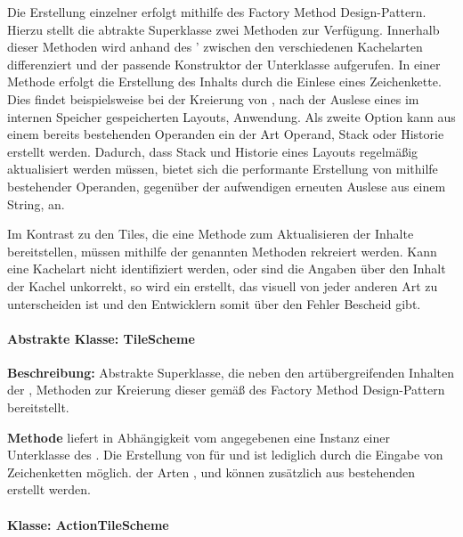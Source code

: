 Die Erstellung einzelner  erfolgt mithilfe des Factory Method Design-Pattern. Hierzu stellt die abtrakte Superklasse  zwei Methoden zur Verfügung. Innerhalb dieser Methoden wird anhand des ' zwischen den verschiedenen Kachelarten differenziert und der passende Konstruktor der Unterklasse aufgerufen. In einer Methode erfolgt die Erstellung des  Inhalts durch die Einlese eines Zeichenkette. Dies findet beispielsweise bei der Kreierung von , nach der Auslese eines im internen Speicher gespeicherten Layouts, Anwendung. Als zweite Option kann aus einem bereits bestehenden Operanden ein  der Art Operand, Stack oder Historie erstellt werden. Dadurch, dass Stack und Historie eines Layouts regelmäßig aktualisiert werden müssen, bietet sich die performante Erstellung von  mithilfe bestehender Operanden, gegenüber der aufwendigen erneuten Auslese aus einem String, an.

Im Kontrast zu den Tiles, die eine Methode zum Aktualisieren der Inhalte bereitstellen, müssen  mithilfe der genannten Methoden rekreiert werden. Kann eine Kachelart nicht identifiziert werden, oder sind die Angaben über den Inhalt der Kachel unkorrekt, so wird ein  erstellt, das visuell von jeder anderen Art zu unterscheiden ist und den Entwicklern somit über den Fehler Bescheid gibt.

\paragraph{Abstrakte Klasse: TileScheme}

\textbf{Beschreibung: }Abstrakte Superklasse, die neben den artübergreifenden Inhalten der , Methoden zur Kreierung dieser gemäß des Factory Method Design-Pattern bereitstellt.

\textbf{Methode}  liefert in Abhängigkeit vom angegebenen  eine Instanz einer Unterklasse des . Die Erstellung von  für  und  ist lediglich durch die Eingabe von Zeichenketten möglich.  der Arten ,  und  können zusätzlich aus bestehenden  erstellt werden. 

\paragraph{Klasse: ActionTileScheme}

